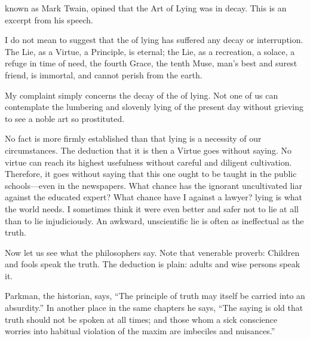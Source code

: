 \documentclass{novelette}
\begin{document}
\begin{display}
\vfil
{\centering{}\par}
\vfil
\end{display}

\blankpage

\mainmatter

\begin{opening}
\null\null\null\null\null\null
{}
\null\null\null\null\null\null\null\null
\end{opening}
 known as Mark Twain, opined that the Art of Lying
was in decay. This is an excerpt from his speech.

\scene{-}

I do not mean to suggest that the  of lying has
suffered any decay or interruption. The Lie, as a Virtue, a
Principle, is eternal; the Lie, as a recreation, a solace, a refuge in
time of need, the fourth Grace, the tenth Muse, man's best and surest
friend, is immortal, and cannot perish from the earth.

My complaint simply concerns the decay of the  of lying.
Not one of us can contemplate the lumbering and slovenly lying of the
present day without grieving to see a noble art so prostituted.

No fact is more firmly established than that lying is a necessity of our
circumstances. The deduction that it is then a Virtue goes without
saying. No virtue can reach its highest usefulness without careful and
diligent cultivation. Therefore, it goes without saying that this one
ought to be taught in the public schools---even in the newspapers. What
chance has the ignorant uncultivated liar against the educated expert?
What chance have I against a lawyer?  lying
is what the world needs. I sometimes think it were even better and safer
not to lie at all than to lie injudiciously. An awkward, unscientific
lie is often as ineffectual as the truth.

Now let us see what the philosophers say. Note that venerable proverb:
Children and fools  speak the truth. The deduction is plain:
adults and wise persons  speak it.


Parkman, the historian, says,
``The principle of truth may itself be carried into an absurdity.'' In
another place in the same chapters he says, ``The saying is old that
truth should not be spoken at all times; and those whom a sick
conscience worries into habitual violation of the maxim are imbeciles
and nuisances.''
\end{document}
